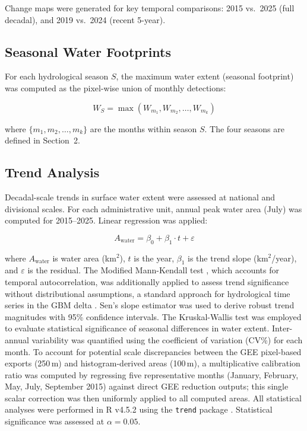 \documentclass[fleqn,10pt,twocolumn]{article}
\begin{document}
Change maps were generated for key temporal comparisons: 2015 vs.\ 2025 (full decadal), and 2019 vs.\ 2024 (recent 5-year).

\subsection{Seasonal Water Footprints}

For each hydrological season $S$, the maximum water extent (seasonal footprint) was computed as the pixel-wise union of monthly detections:

\begin{equation}
W_{S} = \max(W_{m_1}, W_{m_2}, \ldots, W_{m_k})
\label{eq:seasonal}
\end{equation}

where $\{m_1, m_2, \ldots, m_k\}$ are the months within season $S$. The four seasons are defined in Section~2.

\subsection{Trend Analysis}

Decadal-scale trends in surface water extent were assessed at national and divisional scales. For each administrative unit, annual peak water area (July) was computed for 2015--2025. Linear regression was applied:

\begin{equation}
A_{\text{water}} = \beta_0 + \beta_1 \cdot t + \varepsilon
\label{eq:trend}
\end{equation}

where $A_{\text{water}}$ is water area (km$^{2}$), $t$ is the year, $\beta_1$ is the trend slope (km$^{2}$/year), and $\varepsilon$ is the residual. The Modified Mann-Kendall test \cite{hamed1998}, which accounts for temporal autocorrelation, was additionally applied to assess trend significance without distributional assumptions, a standard approach for hydrological time series in the GBM delta \cite{das2023, islam2022}. Sen's slope estimator \cite{sen1968} was used to derive robust trend magnitudes with 95\% confidence intervals. The Kruskal-Wallis test was employed to evaluate statistical significance of seasonal differences in water extent. Inter-annual variability was quantified using the coefficient of variation (CV\%) for each month. To account for potential scale discrepancies between the GEE pixel-based exports (250\,m) and histogram-derived areas (100\,m), a multiplicative calibration ratio was computed by regressing five representative months (January, February, May, July, September 2015) against direct GEE reduction outputs; this single scalar correction was then uniformly applied to all computed areas. All statistical analyses were performed in R v4.5.2 using the \texttt{trend} package \cite{rcoreteam2025}. Statistical significance was assessed at $\alpha = 0.05$.
\end{document}
